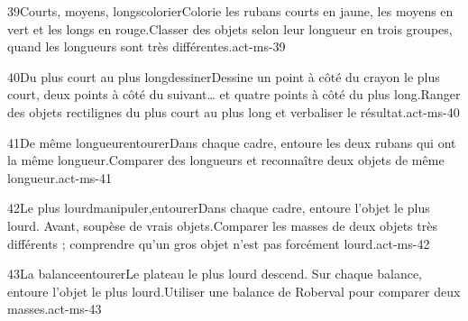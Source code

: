 \begin{activite}{39}{Courts, moyens, longs}{colorier}{Colorie les rubans courts en {\otBold\color{otNavy}jaune}, les moyens en {\otBold\color{otNavy}vert} et les longs en {\otBold\color{otNavy}rouge}.}{Classer des objets selon leur longueur en trois groupes, quand les longueurs sont très différentes.}{act-ms-39}
\end{activite}
\begin{activite}{40}{Du plus court au plus long}{dessiner}{Dessine {\otBold\color{otNavy}un} point à côté du crayon le plus court, {\otBold\color{otNavy}deux} points à côté du suivant… et {\otBold\color{otNavy}quatre} points à côté du plus long.}{Ranger des objets rectilignes du plus court au plus long et verbaliser le résultat.}{act-ms-40}
\end{activite}
\begin{activite}{41}{De même longueur}{entourer}{Dans chaque cadre, {\otBold\color{otNavy}entoure} les deux rubans qui ont la même longueur.}{Comparer des longueurs et reconnaître deux objets de même longueur.}{act-ms-41}
\end{activite}
\begin{activite}{42}{Le plus lourd}{manipuler,entourer}{Dans chaque cadre, {\otBold\color{otNavy}entoure} l’objet le plus lourd. Avant, soupèse de vrais objets.}{Comparer les masses de deux objets très différents ; comprendre qu’un gros objet n’est pas forcément lourd.}{act-ms-42}
\end{activite}
\begin{activite}{43}{La balance}{entourer}{Le plateau le plus lourd descend. Sur chaque balance, {\otBold\color{otNavy}entoure} l’objet le plus lourd.}{Utiliser une balance de Roberval pour comparer deux masses.}{act-ms-43}
\end{activite}
